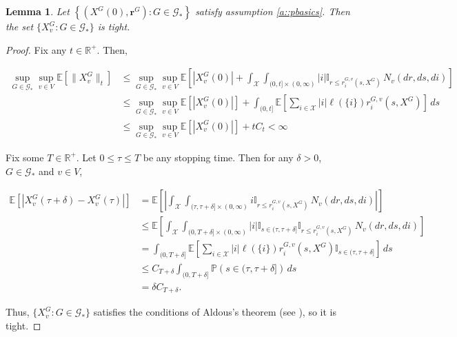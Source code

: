\documentclass[12pt]{article}
\newcommand{\mb}{\mathbb}
\newcommand{\mc}{\mathcal}
\newcommand{\pr}{\mb{P}}							%
\newcommand{\ex}[1]{\mb{E}\left[#1\right]}			%
\newcommand{\sta}{\mc{X}}							%
\newcommand{\Xf}{X}									%
\newcommand{\poiss}{N}								%
\newcommand{\Sm}{\ell}								%
\newcommand{\rate}{r}								%
\newcommand{\poissv}[1]{_{#1}}						%
\newcommand{\vind}[1]{_{#1}}						%
\newcommand{\tme}[1]{(#1)}							%
\newcommand{\gind}[1]{^{#1}}						%
\newcommand{\stpara}[1]{_{#1}}						%
\newcommand{\tpara}[1]{_{#1}}						%
\newcommand{\gvpara}[2]{^{#1,#2}}					%
\newcommand{\rateset}{\mathbf{\rate}}				%
\newcommand{\jumpbd}[1]{C_{#1}}						%
\newcommand{\tmepro}[2]{(#1,#2)}					%
\newcommand{\Gs}{\mc{G}_\ast}						%
\newcommand{\rt}{\tau}								%
\newtheorem{lem}[thms]{Lemma}
\begin{document}
\begin{lem}
Let \(\left\{(\Xf\gind{G}\tme{0},\rateset\gind{G}):G \in \Gs\right\}\) satisfy assumption \ref{a::pbasics}. Then the set \(\{\Xf\gind{G}\vind{v}:G \in \Gs\}\) is tight.
\label{lwc::tight}
\end{lem}
\begin{proof}
Fix any \(t \in \mb{R}^+\). Then,

\begin{align*}
\sup_{G\in \Gs}\sup_{v \in V} \ex{\|\Xf\gind{G}\vind{v}\|\tpara{t}} &\leq \sup_{G\in \Gs}\sup_{v \in V}\ex{|\Xf\gind{G}\vind{v}\tme{0}| + \int_\sta\int_{(0,t]\times(0,\infty)} |i|\mb{I}_{r \leq \rate\gvpara{G}{v}\stpara{i}\tmepro{s}{\Xf\gind{G}}}\,\poiss\poissv{v}(dr,ds,di)}\\
&\leq \sup_{G\in \Gs}\sup_{v \in V}\ex{|\Xf\gind{G}\vind{v}\tme{0}|} + \int_{(0,t]}\ex{\sum_{i\in \sta}|i|\Sm(\{i\})\rate\gvpara{G}{v}\stpara{i}\tmepro{s}{\Xf\gind{G}}}\,ds\\
&\leq \sup_{G\in \Gs}\sup_{v \in V}\ex{|\Xf\gind{G}\vind{v}\tme{0}|} + t\jumpbd{t} < \infty
\end{align*}

Fix some \(T \in \mb{R}^+\). Let \(0 \leq \rt \leq T\) be any stopping time. Then for any \(\delta > 0\), \(G \in \Gs\) and \(v \in V\),

\begin{align*}
\ex{\left|\Xf\gind{G}\vind{v}\tme{\rt + \delta} - \Xf\gind{G}\vind{v}\tme{\rt}\right|} &= \ex{\left|\int_\sta\int_{(\rt,\rt+\delta]\times (0,\infty)} i\mb{I}_{r \leq \rate\gvpara{G}{v}\stpara{i}\tmepro{s}{\Xf\gind{G}}}\,\poiss\poissv{v}(dr,ds,di)\right|}\\
&\leq \ex{\int_\sta\int_{(0,T+\delta]\times (0,\infty)} |i|\mb{I}_{s \in (\rt,\rt+\delta]}\mb{I}_{r \leq \rate\gvpara{G}{v}\stpara{i}\tmepro{s}{\Xf\gind{G}}}\,\poiss\poissv{v}(dr,ds,di)}\\
&= \int_{(0,T + \delta]}\ex{\sum_{i\in \sta} |i|\Sm(\{i\})\rate\gvpara{G}{v}\stpara{i}\tmepro{s}{\Xf\gind{G}}\mb{I}_{s \in (\rt,\rt+\delta]}}\,ds\\
&\leq \jumpbd{T+\delta}\int_{(0,T+\delta]} \pr\left(s \in (\rt,\rt+\delta]\right)\,ds\\
&= \delta\jumpbd{T + \delta}.
\end{align*}

Thus, \(\{\Xf\gind{G}\vind{v}:G \in \Gs\}\) satisfies the conditions of Aldous's theorem (see \cite[Theorem 16.10]{Bil99}), so it is tight.
\end{proof}
\end{document}
